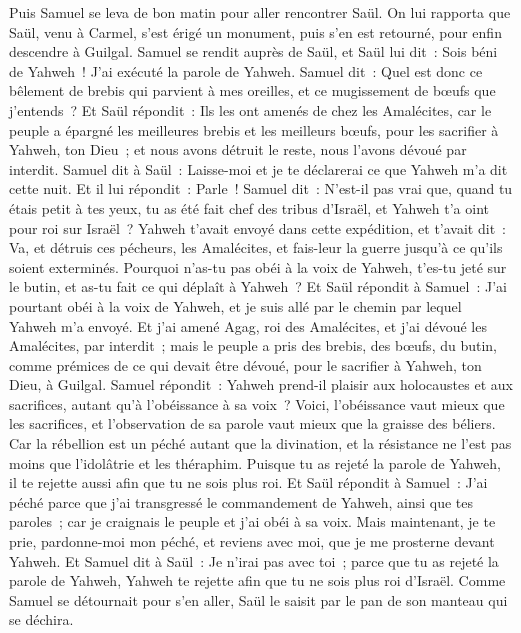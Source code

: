 \begin{multicols}{2}
Puis Samuel se leva de bon matin pour aller rencontrer Saül. On lui rapporta que Saül, venu à Carmel, s'est érigé un monument, puis s'en est retourné, pour enfin descendre à Guilgal.
Samuel se rendit auprès de Saül, et Saül lui dit~: Sois béni de Yahweh~! J'ai exécuté la parole de Yahweh.
Samuel dit~: Quel est donc ce bêlement de brebis qui parvient à mes oreilles, et ce mugissement de bœufs que j'entends~?
Et Saül répondit~: Ils les ont amenés de chez les Amalécites, car le peuple a épargné les meilleures brebis et les meilleurs bœufs, pour les sacrifier à Yahweh, ton Dieu~; et nous avons détruit le reste, nous l'avons dévoué par interdit.
Samuel dit à Saül~: Laisse-moi et je te déclarerai ce que Yahweh m'a dit cette nuit. Et il lui répondit~: Parle~!
Samuel dit~: N'est-il pas vrai que, quand tu étais petit à tes yeux, tu as été fait chef des tribus d'Israël, et Yahweh t'a oint pour roi sur Israël~?
Yahweh t'avait envoyé dans cette expédition, et t'avait dit~: Va, et détruis ces pécheurs, les Amalécites, et fais-leur la guerre jusqu'à ce qu'ils soient exterminés.
Pourquoi n'as-tu pas obéi à la voix de Yahweh, t'es-tu jeté sur le butin, et as-tu fait ce qui déplaît à Yahweh~?
Et Saül répondit à Samuel~: J'ai pourtant obéi à la voix de Yahweh, et je suis allé par le chemin par lequel Yahweh m'a envoyé. Et j'ai amené Agag, roi des Amalécites, et j'ai dévoué les Amalécites, par interdit~;
mais le peuple a pris des brebis, des bœufs, du butin, comme prémices de ce qui devait être dévoué, pour le sacrifier à Yahweh, ton Dieu, à Guilgal.
Samuel répondit~: Yahweh prend-il plaisir aux holocaustes et aux sacrifices, autant qu'à l'obéissance à sa voix~? Voici, l'obéissance vaut mieux que les sacrifices, et l'observation de sa parole vaut mieux que la graisse des béliers.
Car la rébellion est un péché autant que la divination, et la résistance ne l'est pas moins que l'idolâtrie et les théraphim. Puisque tu as rejeté la parole de Yahweh, il te rejette aussi afin que tu ne sois plus roi.
Et Saül répondit à Samuel~: J'ai péché parce que j'ai transgressé le commandement de Yahweh, ainsi que tes paroles~; car je craignais le peuple et j'ai obéi à sa voix.
Mais maintenant, je te prie, pardonne-moi mon péché, et reviens avec moi, que je me prosterne devant Yahweh.
Et Samuel dit à Saül~: Je n'irai pas avec toi~; parce que tu as rejeté la parole de Yahweh, Yahweh te rejette afin que tu ne sois plus roi d'Israël.
Comme Samuel se détournait pour s'en aller, Saül le saisit par le pan de son manteau qui se déchira.

\end{multicols}
